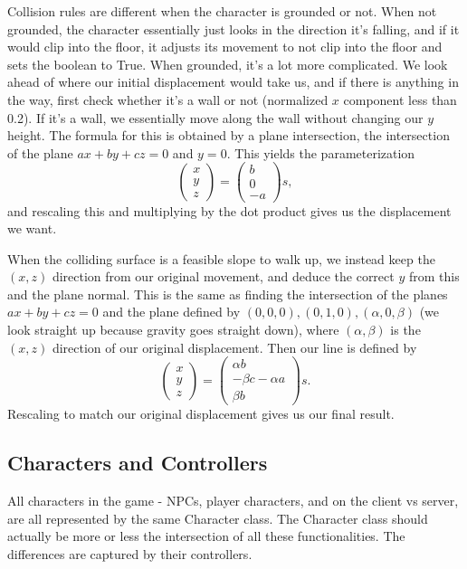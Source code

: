 \documentclass{article}
\begin{document}
Collision rules are different when the character is grounded or not.
When not grounded, the character essentially just looks in the direction it's
falling, and if it would clip into the floor, it adjusts its movement to not clip
into the floor and sets the  boolean to True.
When grounded, it's a lot more complicated. We look ahead of where our initial
displacement would take us, and if there is anything in the way, first check
whether it's a wall or not (normalized $x$ component less than 0.2). If it's a wall,
we essentially move along the wall without changing our $y$ height.
The formula for this is obtained by a plane intersection, the intersection of the
plane $ax + by + cz = 0$ and $y = 0$. This yields the parameterization
\[
\begin{pmatrix}
    x\\
    y\\
    z 
\end{pmatrix} =
\begin{pmatrix}
    b\\0\\-a
\end{pmatrix}s,\]
and rescaling this and multiplying by the dot product gives us the displacement
we want.

When the colliding surface is a feasible slope to walk up, we instead keep
the $(x, z)$ direction from our original movement, and deduce the correct
$y$ from this and the plane normal. This is the same as finding the
intersection of the planes $ax + by + cz = 0$ and the plane defined by
$(0, 0, 0), (0, 1, 0), (\alpha, 0, \beta)$ (we look straight up because gravity goes
straight down), where $(\alpha, \beta)$ is the $(x, z)$ direction of our
original displacement. Then our line is defined by
\[
\begin{pmatrix}
    x\\y\\z
\end{pmatrix} = 
\begin{pmatrix}
    \alpha b\\-\beta c - \alpha a\\\beta b
\end{pmatrix}s.\]
Rescaling to match our original displacement gives us our final result.
\subsection{Characters and Controllers}
All characters in the game - NPCs, player characters, and on the client vs server,
are all represented by the same Character class. The Character class should actually
be more or less the intersection of all these functionalities. The differences
are captured by their controllers.
\end{document}
